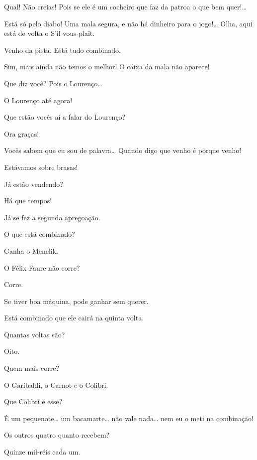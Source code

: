  Qual! Não creias! Pois se ele é um cocheiro que faz da patroa o que
bem quer!\ldots{}

 Está só pelo diabo! Uma mala segura, e não há dinheiro para o
jogo!\ldots{} Olha, aqui está de volta o S’il vous-plaît.

  Venho da pista.
Está tudo combinado.

 Sim, mais ainda não temos o melhor! O caixa da mala não aparece!

 Que diz você? Pois o Lourenço\ldots{}

 O Lourenço até agora!

  Que estão vocês aí a falar do Lourenço?

 Ora graças!

 Vocês sabem que eu sou de palavra\ldots{} Quando digo que venho é
porque venho!

 Estávamos sobre brasas!

 Já estão vendendo?

 Há que tempos!

 Já se fez a segunda apregoação.

 O que está combinado?

 Ganha o Menelik.

 O Félix Faure não corre?

 Corre.

 Se tiver boa máquina, pode ganhar sem querer.

 Está combinado que ele cairá na quinta volta.

 Quantas voltas são?

 Oito.

 Quem mais corre?

 O Garibaldi, o Carnot e o Colibri.

 Que Colibri é esse?

 É um pequenote\ldots{} um bacamarte\ldots{} não vale nada\ldots{} nem eu o meti 
na combinação!

 Os outros quatro quanto recebem?

 Quinze mil-réis cada um.

